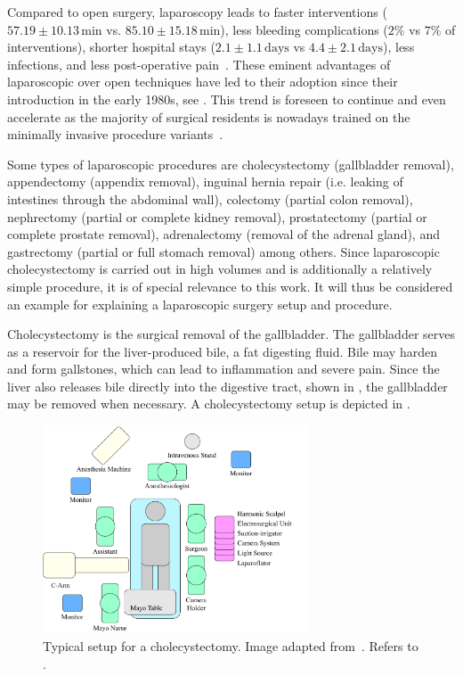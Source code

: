 Compared to open surgery, laparoscopy leads to faster interventions ($57.19\pm10.13\,\text{min}$ vs. $85.10\pm15.18\,\text{min}$), less bleeding complications ($2\%$ vs $7\%$ of interventions), shorter hospital stays ($2.1\pm1.1\,\text{days}$ vs $4.4\pm2.1\,\text{days}$), less infections, and less post-operative pain~\cite{shi2023laparoscopic}. These eminent advantages of laparoscopic over open techniques have led to their adoption since their introduction in the early 1980s, see . This trend is foreseen to continue and even accelerate as the majority of surgical residents is nowadays trained on the minimally invasive procedure variants~\cite{john2020rise}.

Some types of laparoscopic procedures are cholecystectomy (gallbladder removal), appendectomy (appendix removal), inguinal hernia repair (i.e. leaking of intestines through the abdominal wall), colectomy (partial colon removal), nephrectomy (partial or complete kidney removal), prostatectomy (partial or complete prostate removal), adrenalectomy (removal of the adrenal gland), and gastrectomy (partial or full stomach removal) among others. Since laparoscopic cholecystectomy is carried out in high volumes and is additionally a relatively simple procedure, it is of special relevance to this work. It will thus be considered an example for explaining a laparoscopic surgery setup and procedure.

Cholecystectomy is the surgical removal of the gallbladder. The gallbladder serves as a reservoir for the liver-produced bile, a fat digesting fluid. Bile may harden and form gallstones, which can lead to inflammation and severe pain. Since the liver also releases bile directly into the digestive tract, shown in , the gallbladder may be removed when necessary. A cholecystectomy setup is depicted in .
\begin{figure}[tb]
    \centering
    \includegraphics[width=0.7\textwidth]{introduction/fig/24_01_26_room_setup.pdf}
    \caption{Typical setup for a cholecystectomy. Image adapted from~\cite{sages2010room}. Refers to .}
    \label{in:fig:room_setup}
\end{figure}
